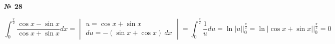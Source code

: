 \documentclass{article}
\begin{document}
\textbf{№ 28} 

$$ \int_{0}^{\frac{\pi}{2}} \frac{\cos{x}-\sin{x}}{\cos{x}+\sin{x}} dx 
= \begin{vmatrix} u = \cos{x}+\sin{x} \\
                 du = -(\sin{x}+\cos{x}) \ dx \end{vmatrix} 
= \int_{0}^{\frac{\pi}{2}} \frac{1}{u}du
= \ln{\left| u \right|} \bigg\vert_{0}^{\frac{\pi}{2}} 
= \ln{\left| \cos{x}+\sin{x} \right|} \bigg\vert_{0}^{\frac{\pi}{2}}
= 0 $$
\end{document}

